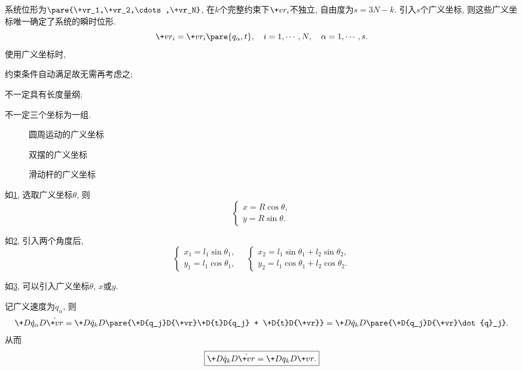 \documentclass[../LectureNotes.tex]{subfiles}
\begin{document}
系统位形为$\pare{\+vr_1,\+vr_2,\cdots,\+vr_N}$, 在$k$个完整约束下$\+vr_i$不独立, 自由度为$s=3N - k$. 引入$s$个广义坐标, 则这些广义坐标唯一确定了系统的瞬时位形.
\[ \+vr_i = \+vr_i\pare{q_\alpha, t},\quad i=1,\cdots, N,\quad  \alpha=1,\cdots, s. \]
使用广义坐标时,
\begin{cenum}
    \item 约束条件自动满足故无需再考虑之;
    \item 不一定具有长度量纲;
    \item 不一定三个坐标为一组.
\end{cenum}
\begin{figure}[ht]
    \centering
    \caption{圆周运动的广义坐标}
    \label{fig:圆周运动的广义坐标}
\end{figure}
\begin{figure}[ht]
    \centering
    \caption{双摆的广义坐标}
    \label{fig:双摆的广义坐标}
\end{figure}
\begin{figure}[htbp]
    \centering
    \caption{滑动杆的广义坐标}
    \label{fig:滑动杆的广义坐标}
\end{figure}
\begin{sample}
    \begin{ex}
        如\cref{fig:圆周运动的广义坐标}, 选取广义坐标$\theta$, 则
        \[ \begin{cases}
            x = R\cos\theta,\\
            y = R\sin\theta.
        \end{cases} \]
    \end{ex}
\end{sample}
\begin{sample}
    \begin{ex}
        如\cref{fig:双摆的广义坐标}, 引入两个角度后,
        \[ \begin{cases}
            x_1 = l_1\sin\theta_1,\\
            y_1 = l_1\cos\theta_1,
        \end{cases}\quad \begin{cases}
            x_2 = l_1\sin\theta_1 + l_2\sin\theta_2,\\
            y_2 = l_1\cos\theta_1 + l_2\cos\theta_2.
        \end{cases} \]
    \end{ex}
\end{sample}
\begin{sample}
    \begin{ex}
        如\cref{fig:滑动杆的广义坐标}, 可以引入广义坐标$\theta$, $x$或$y$.
    \end{ex}
\end{sample}
记广义速度为$\dot{q}_\alpha$, 则
\[ \+D{\dot{q}_\alpha}D{\dot{\+vr}} = \+D{\dot{q}_k}D{}\pare{\+D{q_j}D{\+vr}\+D{t}D{q_j} + \+D{t}D{\+vr}} = \+D{\dot{q}_k}D{}\pare{\+D{q_j}D{\+vr}\dot{q}_j}. \]
从而
\[ \boxed{\+D{\dot{q}_k}D{\dot{\+vr}} = \+D{q_k}D{\+vr}.} \]
\end{document}
